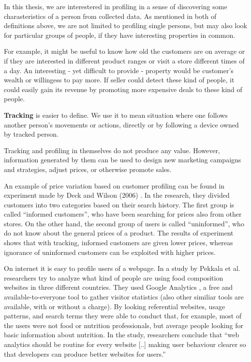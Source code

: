 \documentclass[12pt,a4paper,oneside,pdftex]{report}
\begin{document}
In this thesis, we are interestered in profiling in a sense of discovering some charasteristics of a person from collected data. As mentioned in both of definitions above, we are not limited to profiling single persons, but may also look for particular groups of people, if they have interesting properties in common.

For example, it might be useful to know how old the customers are on average or if they are interested in different product ranges or visit a store different times of a day. An interesting - yet difficult to provide - property would be customer's wealth or willingess to pay more. If seller could detect these kind of people, it could easily gain its revenue by promoting more expensive deals to these kind of people.

\textbf{Tracking} is easier to define. We use it to mean situation where one follows another person's movements or actions, directly or by following a device owned by tracked person. 

Tracking and profiling in themselves do not produce any value. However, information generated by them can be used to design new marketing campaigns and strategies, adjust prices, or otherwise promote sales.

An example of price variation based on customer profiling can be found in experiment made by Deck and Wilson (2006) \cite{Deck2006}. In the research, they divided customers into two categories based on their search history. The first group is called ``informed customers'', who have been searching for prices also from other stores. On the other hand, the second group of users is called ``uninformed'', who do not know about the general prices of a product. The results of experiment shows that with tracking, informed customers are given lower prices, whereas ignorance of uninformed customers can be exploited with higher prices.

On internet it is easy to profile users of a webpage. In a study by Pekkala et al. \cite{Pakkala2012504} researchers try to analyze what kind of people are using food composition websites in three different countries. They used Google Analytics \cite{googleanalytics}, a free and available-to-everyone tool to gather visitor statistics (also other similiar tools are available, with or without a charge). By looking referential websites, usage patterns, and search terms they were able to conduct that, for example, most of the users were not food or nutrition professionals, but average people looking for basic information about nutrition. In the study, researchers conclude that ``web analytics should be routine for every website [..] making user behaviour clearer so that developers can produce better websites for users.''
\end{document}
